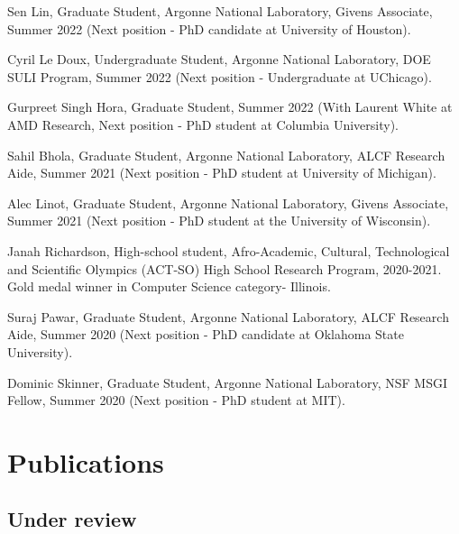 \documentclass[letterpaper]{article}
\renewenvironment{itemize}{
  \begin{list}{}{
    \setlength{\leftmargin}{1.5em}
  }
}{
  \end{list}
}
\begin{document}
\begin{itemize}
  \item Sen Lin, Graduate Student, Argonne National Laboratory, Givens Associate, Summer 2022 (Next position - PhD candidate at University of Houston).

  \item Cyril Le Doux, Undergraduate Student, Argonne National Laboratory, DOE SULI Program, Summer 2022 (Next position - Undergraduate at UChicago).

  \item Gurpreet Singh Hora, Graduate Student, Summer 2022 (With Laurent White at AMD Research, Next position - PhD student at Columbia University).

  \item Sahil Bhola, Graduate Student, Argonne National Laboratory, ALCF Research Aide, Summer 2021 (Next position - PhD student at University of Michigan).

  \item Alec Linot, Graduate Student, Argonne National Laboratory, Givens Associate, Summer 2021 (Next position - PhD student at the University of Wisconsin).

  \item Janah Richardson, High-school student, Afro-Academic, Cultural, Technological and Scientific Olympics (ACT-SO) High School Research Program, 2020-2021. Gold medal winner in Computer Science category- Illinois.

  \item Suraj Pawar, Graduate Student, Argonne National Laboratory, ALCF Research Aide, Summer 2020 (Next position - PhD candidate at Oklahoma State University).

  \item Dominic Skinner, Graduate Student, Argonne National Laboratory, NSF MSGI Fellow, Summer 2020 (Next position - PhD student at MIT).

\end{itemize}


\section*{Publications}

\subsection*{Under review}
\end{document}
